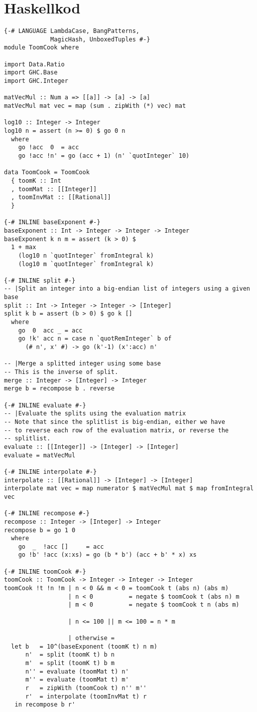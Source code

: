 \section{Haskellkod}
\label{sec:haskell}
\begin{verbatim}
{-# LANGUAGE LambdaCase, BangPatterns,
             MagicHash, UnboxedTuples #-}
module ToomCook where

import Data.Ratio
import GHC.Base
import GHC.Integer

matVecMul :: Num a => [[a]] -> [a] -> [a]
matVecMul mat vec = map (sum . zipWith (*) vec) mat

log10 :: Integer -> Integer
log10 n = assert (n >= 0) $ go 0 n
  where
    go !acc  0  = acc
    go !acc !n' = go (acc + 1) (n' `quotInteger` 10)

data ToomCook = ToomCook
  { toomK :: Int
  , toomMat :: [[Integer]]
  , toomInvMat :: [[Rational]]
  }

{-# INLINE baseExponent #-}
baseExponent :: Int -> Integer -> Integer -> Integer
baseExponent k n m = assert (k > 0) $
  1 + max
    (log10 n `quotInteger` fromIntegral k)
    (log10 m `quotInteger` fromIntegral k)

{-# INLINE split #-}
-- |Split an integer into a big-endian list of integers using a given base
split :: Int -> Integer -> Integer -> [Integer]
split k b = assert (b > 0) $ go k []
  where
    go  0  acc _ = acc
    go !k' acc n = case n `quotRemInteger` b of
      (# n', x' #) -> go (k'-1) (x':acc) n'

-- |Merge a splitted integer using some base
-- This is the inverse of split.
merge :: Integer -> [Integer] -> Integer
merge b = recompose b . reverse

{-# INLINE evaluate #-}
-- |Evaluate the splits using the evaluation matrix
-- Note that since the splitlist is big-endian, either we have
-- to reverse each row of the evaluation matrix, or reverse the
-- splitlist.
evaluate :: [[Integer]] -> [Integer] -> [Integer]
evaluate = matVecMul

{-# INLINE interpolate #-}
interpolate :: [[Rational]] -> [Integer] -> [Integer]
interpolate mat vec = map numerator $ matVecMul mat $ map fromIntegral vec

{-# INLINE recompose #-}
recompose :: Integer -> [Integer] -> Integer
recompose b = go 1 0
  where
    go  _  !acc []     = acc
    go !b' !acc (x:xs) = go (b * b') (acc + b' * x) xs

{-# INLINE toomCook #-}
toomCook :: ToomCook -> Integer -> Integer -> Integer
toomCook !t !n !m | n < 0 && m < 0 = toomCook t (abs n) (abs m)
                  | n < 0          = negate $ toomCook t (abs n) m
                  | m < 0          = negate $ toomCook t n (abs m)

                  | n <= 100 || m <= 100 = n * m

                  | otherwise =
  let b   = 10^(baseExponent (toomK t) n m)
      n'  = split (toomK t) b n
      m'  = split (toomK t) b m
      n'' = evaluate (toomMat t) n'
      m'' = evaluate (toomMat t) m'
      r   = zipWith (toomCook t) n'' m''
      r'  = interpolate (toomInvMat t) r
   in recompose b r'
\end{verbatim}
